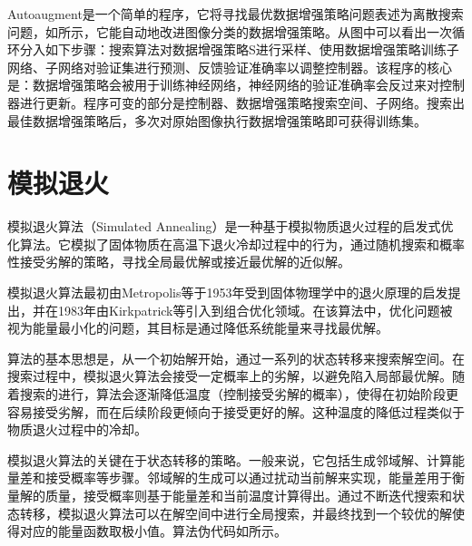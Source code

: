 {	Autoaugment\citep{Cubuk19}是一个简单的程序，它将寻找最优数据增强策略问题表述为离散搜索问题，如所示，它能自动地改进图像分类的数据增强策略。从图中可以看出一次循环分入如下步骤：搜索算法对数据增强策略S进行采样、使用数据增强策略训练子网络、子网络对验证集进行预测、反馈验证准确率以调整控制器。该程序的核心是：数据增强策略会被用于训练神经网络，神经网络的验证准确率会反过来对控制器进行更新。程序可变的部分是控制器、数据增强策略搜索空间、子网络。搜索出最佳数据增强策略后，多次对原始图像执行数据增强策略即可获得训练集。
	
	
	\section{模拟退火}\label{sec:sa}
	模拟退火算法（Simulated Annealing）是一种基于模拟物质退火过程的启发式优化算法。它模拟了固体物质在高温下退火冷却过程中的行为，通过随机搜索和概率性接受劣解的策略，寻找全局最优解或接近最优解的近似解。
	
	模拟退火算法最初由Metropolis等\citep{Metropolis53}于1953年受到固体物理学中的退火原理的启发提出，并在1983年由Kirkpatrick等\citep{Kirkpatrick83}引入到组合优化领域。在该算法中，优化问题被视为能量最小化的问题，其目标是通过降低系统能量来寻找最优解。
	
	算法的基本思想是，从一个初始解开始，通过一系列的状态转移来搜索解空间。在搜索过程中，模拟退火算法会接受一定概率上的劣解，以避免陷入局部最优解。随着搜索的进行，算法会逐渐降低温度（控制接受劣解的概率），使得在初始阶段更容易接受劣解，而在后续阶段更倾向于接受更好的解\citep{Steinbrunn1997}。这种温度的降低过程类似于物质退火过程中的冷却。
	
	模拟退火算法的关键在于状态转移的策略。一般来说，它包括生成邻域解、计算能量差和接受概率等步骤。邻域解的生成可以通过扰动当前解来实现，能量差用于衡量解的质量，接受概率则基于能量差和当前温度计算得出。通过不断迭代搜索和状态转移，模拟退火算法可以在解空间中进行全局搜索，并最终找到一个较优的解使得对应的能量函数取极小值。算法伪代码如所示。
	
}
